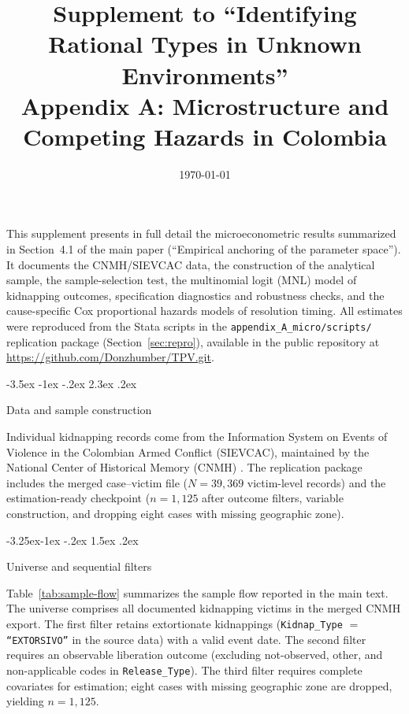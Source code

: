\documentclass[12pt]{article}
\makeatletter
\numberwithin{equation}{section}
\numberwithin{table}{section}
\renewcommand\section{\@startsection {section}{1}{\z@}%
                                   {-3.5ex \@plus -1ex \@minus -.2ex}%
                                   {2.3ex \@plus.2ex}%
                                   {\normalfont\Large\bfseries\raggedright}}
\renewcommand\subsection{\@startsection{subsection}{2}{\z@}%
                                     {-3.25ex\@plus -1ex \@minus -.2ex}%
                                     {1.5ex \@plus .2ex}%
                                     {\normalfont\large\bfseries\raggedright}}
\makeatother
\begin{document}
\title{Supplement to ``Identifying Rational Types in Unknown Environments''\\
Appendix A: Microstructure and Competing Hazards in Colombia}
\author{}
\date{\today}
\maketitle

\noindent
This supplement presents in full detail the microeconometric results
summarized in Section~4.1 of the main paper (``Empirical anchoring of the
parameter space''). It documents the CNMH/SIEVCAC data, the construction
of the analytical sample, the sample-selection test, the multinomial logit
(MNL) model of kidnapping outcomes, specification diagnostics and robustness
checks, and the cause-specific Cox proportional hazards models of resolution
timing. All estimates were reproduced from the Stata scripts in the
\texttt{appendix\_A\_micro/scripts/} replication package (Section~\ref{sec:repro}),
available in the public repository at \url{https://github.com/Donzhumber/TPV.git}.

\section{Data and sample construction}
\label{sec:data}

Individual kidnapping records come from the Information System on Events of
Violence in the Colombian Armed Conflict (SIEVCAC), maintained by the
National Center of Historical Memory (CNMH) \citep{cnmh_datos,CNMH2013}.
The replication package includes the merged case--victim file
 ($N=39{,}369$ victim-level records) and the
estimation-ready checkpoint  ($n=1{,}125$
after outcome filters, variable construction, and dropping eight cases with
missing geographic zone).

\subsection{Universe and sequential filters}

Table~\ref{tab:sample-flow} summarizes the sample flow reported in the main
text. The universe comprises all documented kidnapping victims in the merged
CNMH export. The first filter retains extortionate kidnappings
(\texttt{Kidnap\_Type} $=$ \texttt{``EXTORSIVO''} in the source data) with a valid event date. The second
filter requires an observable liberation outcome (excluding not-observed,
other, and non-applicable codes in \texttt{Release\_Type}). The third
filter requires complete covariates for estimation; eight cases with missing
geographic zone are dropped, yielding $n=1{,}125$.
\end{document}
